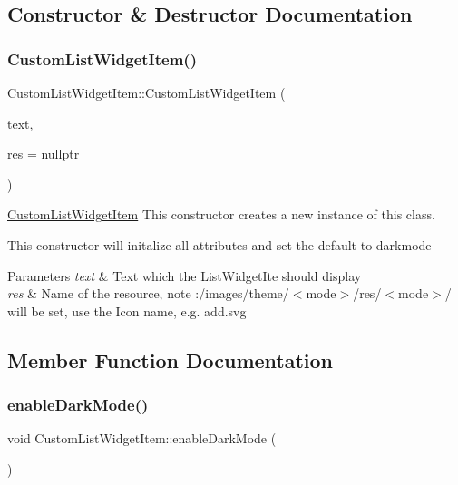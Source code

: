 \subsection{Constructor \& Destructor Documentation}
\mbox{\label{class_custom_list_widget_item_a7da08f342e6eeb0a2a4833c3031a9246}} 
\subsubsection{\texorpdfstring{Custom\+List\+Widget\+Item()}{CustomListWidgetItem()}}
{\footnotesize\ttfamily Custom\+List\+Widget\+Item\+::\+Custom\+List\+Widget\+Item (\begin{DoxyParamCaption}\item[{Q\+String}]{text,  }\item[{Q\+String}]{res = {\ttfamily nullptr} }\end{DoxyParamCaption})}



\mbox{\hyperlink{class_custom_list_widget_item}{Custom\+List\+Widget\+Item}} This constructor creates a new instance of this class. 

This constructor will initalize all attributes and set the default to darkmode 
\begin{DoxyParams}{Parameters}
{\em text} & Text which the List\+Widget\+Ite should display \\
\hline
{\em res} & Name of the resource, note \+:/images/theme/$<$mode$>$/res/$<$mode$>$/ will be set, use the Icon name, e.\+g. add.\+svg \\
\hline
\end{DoxyParams}


\subsection{Member Function Documentation}
\mbox{\label{class_custom_list_widget_item_a97000c77f8c27f46c8ef2cc0ee824db0}} 
\subsubsection{\texorpdfstring{enable\+Dark\+Mode()}{enableDarkMode()}}
{\footnotesize\ttfamily void Custom\+List\+Widget\+Item\+::enable\+Dark\+Mode (\begin{DoxyParamCaption}\item[{void}]{ }\end{DoxyParamCaption})}



